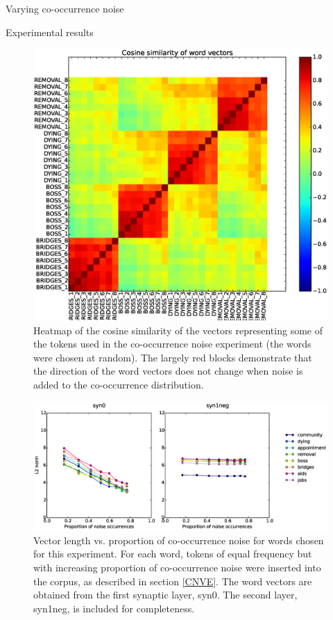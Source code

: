 \documentclass{article} %
\begin{document}
\begin{section}{Varying co-occurrence noise}
\begin{subsection}{Experimental results}
\begin{figure}
	\includegraphics[scale=0.5]{cooccurrence-noise-heatmap}
	\caption{ Heatmap of the cosine similarity of the vectors
          representing some of the tokens used in the co-occurrence
          noise experiment (the words were chosen at random).  The
          largely red blocks demonstrate that the direction of the word
          vectors does not change when noise is added to the
          co-occurrence distribution.  }
	\label{fig:co-occurrence-noise-heatmap}
\end{figure}

\begin{figure}
	\includegraphics[scale=0.6]{cooccurrence-noise-graph}
	\caption{ Vector length vs. proportion of co-occurrence noise
          for words chosen for this experiment.  For each word, tokens
          of equal frequency but with increasing proportion of
          co-occurrence noise were inserted into the corpus, as
          described in section \ref{CNVE}.  The word vectors are
          obtained from the first synaptic layer, syn0.  The second
          layer, syn1neg, is included for completeness.  }
	\label{fig:co-occurrence-noise-graph}
\end{figure}

\end{subsection}

\end{section}
\end{document}
